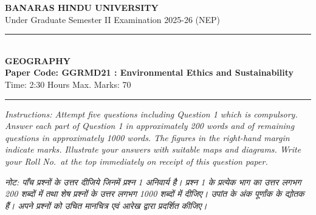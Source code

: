 \documentclass[11pt,a4paper]{article}
\begin{document}
\begin{center}
  {\large\bfseries BANARAS HINDU UNIVERSITY}\\[2pt]
  {\normalsize Under Graduate Semester II Examination 2025-26 (NEP)}\\[6pt]
  \rule{0.8\linewidth}{0.5pt}\\[6pt]
  {\large\bfseries GEOGRAPHY}\\[4pt]
  {\large\bfseries Paper Code: GGRMD21 : Environmental Ethics and Sustainability}\\[4pt]
  {\normalsize Time: 2:30 Hours \hfill Max. Marks: 70}
\end{center}
\rule{\linewidth}{0.4pt}
\smallskip

\noindent \textit{Instructions: Attempt five questions including Question 1 which is compulsory. Answer each part of Question 1 in approximately 200 words and of remaining questions in approximately 1000 words. The figures in the right-hand margin indicate marks. Illustrate your answers with suitable maps and diagrams. Write your Roll No.\ at the top immediately on receipt of this question paper.}

\smallskip
\noindent \textit{नोट: पाँच प्रश्नों के उत्तर दीजिये जिनमें प्रश्न 1 अनिवार्य है। प्रश्न 1 के प्रत्येक भाग का उत्तर लगभग 200 शब्दों में तथा शेष प्रश्नों के उत्तर लगभग 1000 शब्दों में दीजिए। उपांत के अंक पूर्णांक के द्योतक हैं। अपने प्रश्नों को उचित मानचित्र एवं आरेख द्वारा प्रदर्शित कीजिए।}

\bigskip
\end{document}
